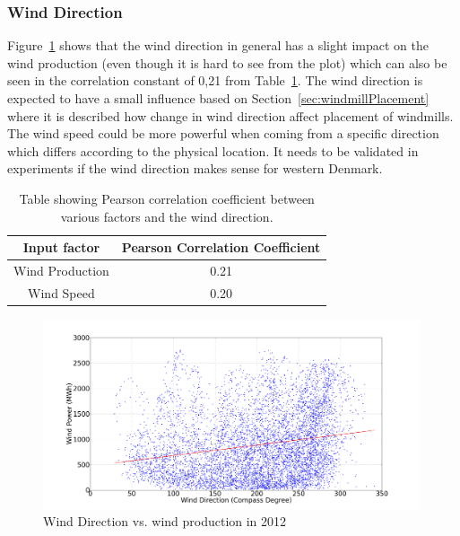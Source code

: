 \subsubsection{Wind Direction}
Figure~\ref{fig:windDirVsProd} shows that the wind direction in general has a slight impact on the wind production (even though it is hard to see from the plot) which can also be seen in the correlation constant of 0,21 from Table~\ref{table:pearsonCoeficientWindDirection}. The wind direction is expected to have a small influence based on Section~\ref{sec:windmillPlacement} where it is described how change in wind direction affect placement of windmills. The wind speed could be more powerful when coming from a specific direction which differs according to the physical location. It needs to be validated in experiments if the wind direction makes sense for western Denmark.
 
\begin{table}[H]
\centering  %
\begin{tabular}{|c|c|} %
\hline
Input factor & Pearson Correlation Coefficient \\ %
\hline                  %
Wind Production & 0.21 \\ \hline %
Wind Speed & 0.20 \\ \hline %
\hline %
\end{tabular}
\caption{Table showing Pearson correlation coefficient between various factors and the wind direction.} %
\label{table:pearsonCoeficientWindDirection} %
\end{table}

\begin{figure}[h!]
\centering
\includegraphics[width=0.99\textwidth]{billeder/productionVsWindDirection.png}
\caption{Wind Direction vs. wind production in 2012}
\label{fig:windDirVsProd}
\end{figure}

